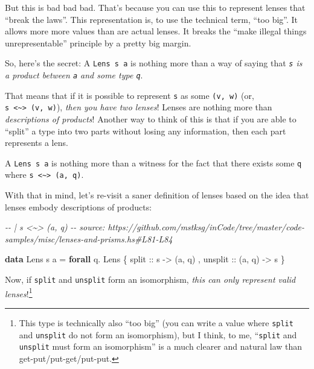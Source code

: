 \documentclass[]{article}
\newenvironment{Shaded}{}{}
\newcommand{\CommentTok}[1]{\textcolor[rgb]{0.38,0.63,0.69}{\textit{#1}}}
\newcommand{\DataTypeTok}[1]{\textcolor[rgb]{0.56,0.13,0.00}{#1}}
\newcommand{\KeywordTok}[1]{\textcolor[rgb]{0.00,0.44,0.13}{\textbf{#1}}}
\newcommand{\NormalTok}[1]{#1}
\newcommand{\OperatorTok}[1]{\textcolor[rgb]{0.40,0.40,0.40}{#1}}
\newcommand{\OtherTok}[1]{\textcolor[rgb]{0.00,0.44,0.13}{#1}}
\begin{document}
But this is bad bad bad. That's because you can use this to represent lenses
that ``break the laws''. This representation is, to use the technical term,
``too big''. It allows more more values than are actual lenses. It breaks the
``make illegal things unrepresentable'' principle by a pretty big margin.

So, here's the secret: A \texttt{Lens\textquotesingle{}\ s\ a} is nothing more
than a way of saying that \emph{\texttt{s} is a product between \texttt{a} and
some type \texttt{q}}.

That means that if it is possible to represent \texttt{s} as some
\texttt{(v,\ w)} (or,
\texttt{s\ \textless{}\textasciitilde{}\textgreater{}\ (v,\ w)}), \emph{then you
have two lenses}! Lenses are nothing more than \emph{descriptions of products}!
Another way to think of this is that if you are able to ``split'' a type into
two parts without losing any information, then each part represents a lens.

A \texttt{Lens\textquotesingle{}\ s\ a} is nothing more than a witness for the
fact that there exists some \texttt{q} where
\texttt{s\ \textless{}\textasciitilde{}\textgreater{}\ (a,\ q)}.

With that in mind, let's re-visit a saner definition of lenses based on the idea
that lenses embody descriptions of products:

\begin{Shaded}
\begin{Highlighting}[]
\CommentTok{{-}{-} | s <\textasciitilde{}> (a, q)}
\CommentTok{{-}{-} source: https://github.com/mstksg/inCode/tree/master/code{-}samples/misc/lenses{-}and{-}prisms.hs\#L81{-}L84}

\KeywordTok{data} \DataTypeTok{Lens\textquotesingle{}}\NormalTok{ s a }\OtherTok{=} \KeywordTok{forall}\NormalTok{ q}\OperatorTok{.} \DataTypeTok{Lens\textquotesingle{}}
\NormalTok{    \{}\OtherTok{ split   ::}\NormalTok{ s }\OtherTok{{-}>}\NormalTok{ (a, q)}
\NormalTok{    ,}\OtherTok{ unsplit ::}\NormalTok{ (a, q) }\OtherTok{{-}>}\NormalTok{ s}
\NormalTok{    \}}
\end{Highlighting}
\end{Shaded}

Now, if \texttt{split} and \texttt{unsplit} form an isomorphism, \emph{this can
only represent valid lenses}!\footnote{This type is technically also ``too big''
  (you can write a value where \texttt{split} and \texttt{unsplit} do not form
  an isomorphism), but I think, to me, ``\texttt{split} and \texttt{unsplit}
  must form an isomorphism'' is a much clearer and natural law than
  get-put/put-get/put-put.}
\end{document}
